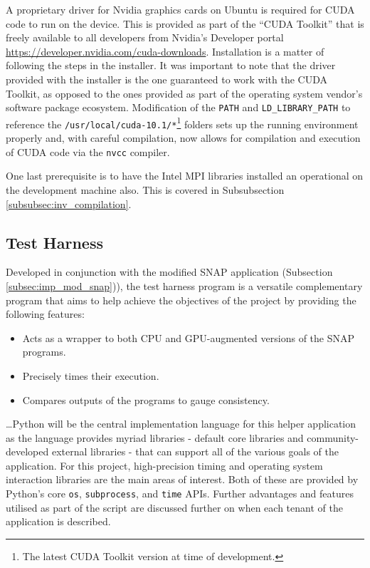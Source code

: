 \documentclass[conference]{IEEEtran}
\begin{document}
A proprietary driver for Nvidia graphics cards on Ubuntu is required for CUDA code to run on the device. This is provided as part of the ``CUDA Toolkit'' that is freely available to all developers from Nvidia's Developer portal \url{https://developer.nvidia.com/cuda-downloads}. Installation is a matter of following the steps in the installer. It was important to note that the driver provided with the installer is the one guaranteed to work with the CUDA Toolkit, as opposed to the ones provided as part of the operating system vendor's software package ecosystem. Modification of the \texttt{PATH} and \texttt{LD\_LIBRARY\_PATH} to reference the \texttt{/usr/local/cuda-10.1/*}\footnote{The latest CUDA Toolkit version at time of development.} folders sets up the running environment properly and, with careful compilation, now allows for compilation and execution of CUDA code via the \texttt{nvcc} compiler.

One last prerequisite is to have the Intel MPI libraries installed an operational on the development machine also. This is covered in Subsubsection \ref{subsubsec:inv_compilation}.


\subsection{Test Harness}
\label{subsec:imp_testharness}

Developed in conjunction with the modified SNAP application (Subsection \ref{subsec:imp_mod_snap})), the test harness program is a versatile complementary program that aims to help achieve the objectives of the project by providing the following features:

\begin{itemize}
    \item Acts as a wrapper to both CPU and GPU-augmented versions of the SNAP programs.
    \item Precisely times their execution.
    \item Compares outputs of the programs to gauge consistency.
\end{itemize}

\dots Python will be the central implementation language for this helper application as the language provides myriad libraries - default core libraries and community-developed external libraries - that can support all of the various goals of the application. For this project, high-precision timing and operating system interaction libraries are the main areas of interest. Both of these are provided by Python's core \texttt{os}, \texttt{subprocess}, and \texttt{time} APIs. Further advantages and features utilised as part of the script are discussed further on when each tenant of the application is described.
\end{document}
